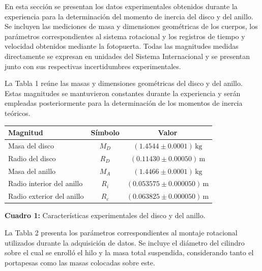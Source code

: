 \documentclass[11pt,a4paper]{article}
\begin{document}
En esta sección se presentan los datos experimentales obtenidos durante
la experiencia para la determinación del momento de inercia del disco y
del anillo. Se incluyen las mediciones de masa y dimensiones geométricas
de los cuerpos, los parámetros correspondientes al sistema rotacional y
los registros de tiempo y velocidad obtenidos mediante la fotopuerta.
Todas las magnitudes medidas directamente se expresan en unidades del
Sistema Internacional y se presentan junto con sus respectivas
incertidumbres experimentales.

La Tabla 1 reúne las masas y dimensiones geométricas del disco y del
anillo. Estas magnitudes se mantuvieron constantes durante la experiencia
y serán empleadas posteriormente para la determinación de los momentos
de inercia teóricos.

\begin{table}[h!]
\centering
\renewcommand{\arraystretch}{1.25}

\begin{tabular}{lcc}
\hline
\textbf{Magnitud} & \textbf{Símbolo} & \textbf{Valor} \\
\hline
Masa del disco
& \(M_D\)
& \((1.4544 \pm 0.0001)\,\mathrm{kg}\) \\

Radio del disco
& \(R_D\)
& \((0.11430 \pm 0.00050)\,\mathrm{m}\) \\

Masa del anillo
& \(M_A\)
& \((1.4466 \pm 0.0001)\,\mathrm{kg}\) \\

Radio interior del anillo
& \(R_i\)
& \((0.053575 \pm 0.000050)\,\mathrm{m}\) \\

Radio exterior del anillo
& \(R_e\)
& \((0.063825 \pm 0.000050)\,\mathrm{m}\) \\
\hline
\end{tabular}

\vspace{0.2cm}

\textbf{Cuadro 1:} Características experimentales del disco y del anillo.

\end{table}


La Tabla 2 presenta los parámetros correspondientes al montaje
rotacional utilizados durante la adquisición de datos. Se incluye el
diámetro del cilindro sobre el cual se enrolló el hilo y la masa total
suspendida, considerando tanto el portapesas como las masas colocadas
sobre este.
\end{document}
